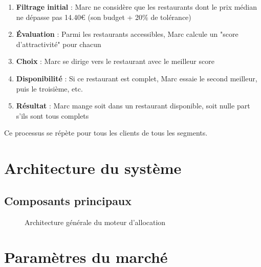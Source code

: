 \documentclass[12pt,a4paper]{article}
\begin{document}
\begin{enumerate}
    \item \textbf{Filtrage initial} : Marc ne considère que les restaurants dont le prix médian ne dépasse pas 14.40€ (son budget + 20\% de tolérance)
    \item \textbf{Évaluation} : Parmi les restaurants accessibles, Marc calcule un "score d'attractivité" pour chacun
    \item \textbf{Choix} : Marc se dirige vers le restaurant avec le meilleur score
    \item \textbf{Disponibilité} : Si ce restaurant est complet, Marc essaie le second meilleur, puis le troisième, etc.
    \item \textbf{Résultat} : Marc mange soit dans un restaurant disponible, soit nulle part s'ils sont tous complets
\end{enumerate}

Ce processus se répète pour tous les clients de tous les segments.

\section{Architecture du système}

\subsection{Composants principaux}

\begin{figure}[H]
\centering
{}
\caption{Architecture générale du moteur d'allocation}
\end{figure}

\section{Paramètres du marché}
\end{document}
